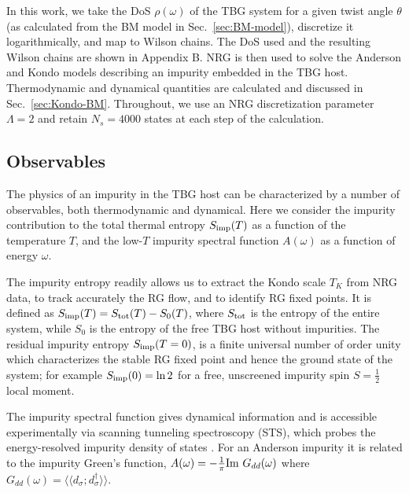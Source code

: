 In this work, we take the DoS $\rho(\omega)$ of the TBG system for a given twist angle $\theta$ (as calculated from the BM model in Sec.~\ref{sec:BM-model}), discretize it logarithmically, and map to Wilson chains. The DoS used and the resulting Wilson chains are shown in Appendix B. NRG is then used to solve the Anderson and Kondo models describing an impurity embedded in the TBG host. Thermodynamic and dynamical quantities are calculated and discussed in Sec.~\ref{sec:Kondo-BM}. Throughout, we use an NRG discretization parameter $\Lambda=2$ and retain $N_s=4000$ states at each step of the calculation.


\subsection{Observables}
\label{sec:obs} 

The physics of an impurity in the TBG host can be characterized by a number of observables, both thermodynamic and dynamical. 
Here we consider the impurity contribution to the total thermal entropy $S_{\rm imp}(T)$ as a function of the temperature $T$, and the low-$T$ impurity spectral function $A(\omega)$ as a function of energy $\omega$. 

The impurity entropy readily allows us to extract the Kondo scale $T_K$ from NRG data, to track accurately the RG flow, and to identify RG fixed points. It is defined as $S_{\rm{imp}}(T) = S_{\rm{tot}}(T) - S_0(T)$, where $S_{\rm{tot}}$ is the entropy of the entire system, while $S_0$ is the entropy of the free TBG host without impurities. The residual  impurity entropy $S_{\rm imp}(T=0)$, is a finite universal number of order unity which characterizes the stable RG fixed point and hence the ground state of the system; for example $S_{\rm imp}(0)=\ln 2$ for a free, unscreened impurity spin $S=\tfrac{1}{2}$ local moment.

The impurity spectral function gives dynamical information and is accessible experimentally via scanning tunneling spectroscopy (STS), which probes the energy-resolved impurity density of states \cite{ternes2008spectroscopic}. For an Anderson impurity it is related to the impurity Green's function, $A(\omega)=-\tfrac{1}{\pi}{\rm Im}~G_{dd}(\omega)$ where $G_{dd}(\omega)=\langle\langle d_{\sigma}^{\phantom{\dagger}} ; d_{\sigma}^{\dagger}\rangle\rangle$. 


